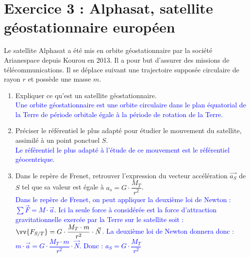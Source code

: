 \documentclass[a4paper,12pt]{article}
\begin{document}
\section*{Exercice 3 : Alphasat, satellite géostationnaire européen}
Le satellite Alphasat a été mis en orbite géostationnaire par la société Arianespace depuis Kourou en 2013. Il a pour but d'assurer des missions de télécommunications. Il se déplace suivant une trajectoire supposée circulaire de rayon $r$ et possède une masse $m$.
\begin{enumerate}
	\item Expliquer ce qu'est un satellite géostationnaire.\\
\textcolor{blue}{Une orbite géostationnaire est une orbite circulaire dans le plan équatorial de la Terre de période orbitale égale à la période de rotation de la Terre.}
	\item Préciser le référentiel le plus adapté pour étudier le mouvement du satellite, assimilé à un point ponctuel $S$.\\
\textcolor{blue}{Le référentiel le plus adapté à l'étude de ce mouvement est le référentiel géocentrique.}
	\item Dans le repère de Frenet, retrouver l'expression du vecteur accélération $\vec{a_S}$ de $S$ tel que sa valeur est égale à $a_s=G \cdot \dfrac{M_T}{r^2}$.\\
\textcolor{blue}{Dans le repère de Frenet, on peut appliquer la deuxième loi de Newton : $\sum \vec{F}= M \cdot \vec{a}$. Ici la seule force à considérée est la force d'attraction gravitationnelle exercée par la Terre sur le satellite soit : $\vv{F_{S/T}} = G \cdot \dfrac{M_T \cdot m}{r^2} \cdot \vec{N}$. La deuxième loi de Newton donnera donc : $m \cdot \vec{a} = G \cdot \dfrac{M_T \cdot m}{r^2} \cdot \vec{N}$. Donc : $a_S = G \cdot \dfrac{M_T}{r^2}$}
\end{enumerate}
\end{document}
